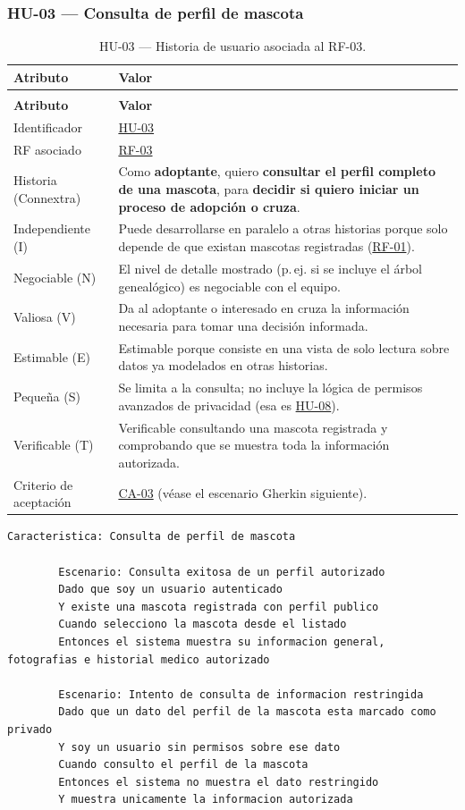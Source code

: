 \documentclass[journal,onecolumn]{IEEEtran}
\makeatletter
\newenvironment{atributos}[2]{%
	\small
	\begin{longtable}{@{}>{\raggedright\arraybackslash}p{4.2cm} >{\raggedright\arraybackslash}p{11.2cm}@{}}
		\caption{#2}\label{tab:#1}\\
		\toprule
		\textbf{Atributo} & \textbf{Valor} \\
		\midrule
		\endfirsthead
		\multicolumn{2}{@{}l}{\small\itshape (continuación)}\\
		\toprule
		\textbf{Atributo} & \textbf{Valor} \\
		\midrule
		\endhead
		\bottomrule
		\endlastfoot
	}{%
	\end{longtable}
	\normalsize
}
\makeatother
\begin{document}
	\subsubsection{HU-03 --- Consulta de perfil de mascota}
	
	\begin{atributos}{HU-03}{HU-03 --- Historia de usuario asociada al RF-03.}
		Identificador & \hyperref[tab:HU-03]{HU-03} \\
		RF asociado & \hyperref[tab:RF-03]{RF-03} \\
		Historia (Connextra) & Como \textbf{adoptante}, quiero \textbf{consultar el perfil completo de una mascota}, para \textbf{decidir si quiero iniciar un proceso de adopción o cruza}. \\
		Independiente (I) & Puede desarrollarse en paralelo a otras historias porque solo depende de que existan mascotas registradas (\hyperref[tab:RF-01]{RF-01}). \\
		Negociable (N) & El nivel de detalle mostrado (p.\,ej. si se incluye el árbol genealógico) es negociable con el equipo. \\
		Valiosa (V) & Da al adoptante o interesado en cruza la información necesaria para tomar una decisión informada. \\
		Estimable (E) & Estimable porque consiste en una vista de solo lectura sobre datos ya modelados en otras historias. \\
		Pequeña (S) & Se limita a la consulta; no incluye la lógica de permisos avanzados de privacidad (esa es \hyperref[tab:HU-08]{HU-08}). \\
		Verificable (T) & Verificable consultando una mascota registrada y comprobando que se muestra toda la información autorizada. \\
		Criterio de aceptación & \hyperref[lst:ca03]{CA-03} (véase el escenario Gherkin siguiente). \\
	\end{atributos}
	
	\begin{lstlisting}[style=gherkin,caption={CA-03 --- Escenario de aceptación de la historia HU-03.},label={lst:ca03}]
		Caracteristica: Consulta de perfil de mascota
		
		Escenario: Consulta exitosa de un perfil autorizado
		Dado que soy un usuario autenticado
		Y existe una mascota registrada con perfil publico
		Cuando selecciono la mascota desde el listado
		Entonces el sistema muestra su informacion general, fotografias e historial medico autorizado
		
		Escenario: Intento de consulta de informacion restringida
		Dado que un dato del perfil de la mascota esta marcado como privado
		Y soy un usuario sin permisos sobre ese dato
		Cuando consulto el perfil de la mascota
		Entonces el sistema no muestra el dato restringido
		Y muestra unicamente la informacion autorizada
	\end{lstlisting}
	
\end{document}
